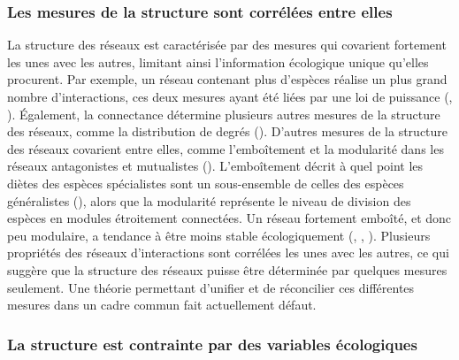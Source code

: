 \subsubsection{Les mesures de la structure sont corrélées entre elles} 

La structure des réseaux est caractérisée par des mesures qui covarient
fortement les unes avec les autres, limitant ainsi l'information écologique
unique qu'elles procurent. Par exemple, un réseau contenant plus d'espèces
réalise un plus grand nombre d'interactions, ces deux mesures ayant été liées
par une loi de puissance (\cite{Brose2004Unified}, \cite{Riede2010Chapter}).
Également, la connectance détermine plusieurs autres mesures de la structure des
réseaux, comme la distribution de degrés (\cite{Poisot2014When}). D'autres
mesures de la structure des réseaux covarient entre elles, comme l'emboîtement
et la modularité dans les réseaux antagonistes et mutualistes
(\cite{Fortuna2010Nestedness}). L'emboîtement décrit à quel point les diètes des
espèces spécialistes sont un sous-ensemble de celles des espèces généralistes
(\cite{Staniczenko2013Ghost}), alors que la modularité représente le niveau de
division des espèces en modules étroitement connectées. Un réseau fortement
emboîté, et donc peu modulaire, a tendance à être moins stable écologiquement
(\cite{Okuyama2008Network}, \cite{Bastolla2009Architecture},
\cite{Thebault2010Stability}). Plusieurs propriétés des réseaux d'interactions
sont corrélées les unes avec les autres, ce qui suggère que la structure des
réseaux puisse être déterminée par quelques mesures seulement. Une théorie
permettant d'unifier et de réconcilier ces différentes mesures dans un cadre
commun fait actuellement défaut.

\subsubsection{La structure est contrainte par des variables écologiques} 

